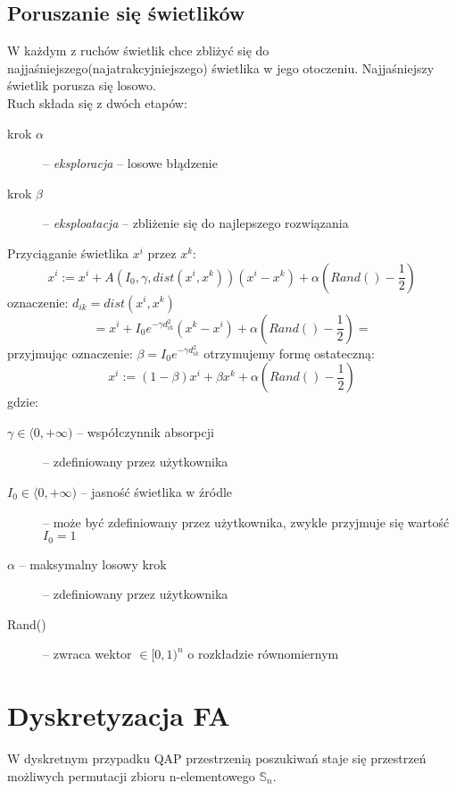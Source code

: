 \documentclass[12pt]{article}
\begin{document}
 \subsection{Poruszanie się świetlików}
 W każdym z ruchów świetlik chce zbliżyć się do najjaśniejszego(najatrakcyjniejszego) świetlika w jego otoczeniu. Najjaśniejszy świetlik porusza się losowo. \\
 Ruch składa się z dwóch etapów:
 \begin{description}
  \item[krok $\alpha$] -- \emph{eksploracja} -- losowe błądzenie
  \item[krok $\beta$] -- \emph{eksploatacja} -- zbliżenie się do najlepszego rozwiązania
 \end{description}
 Przyciąganie świetlika $x^i$ przez $x^k$:
\begin{equation}
 x^i := x^i + A\left(I_0, \gamma, dist\left(x^i, x^k\right)\right)\left(x^i - x^k \right) + \alpha \left(Rand() - \frac{1}{2}\right) 
\end{equation}
oznaczenie: $d_{ik} = dist(x^i, x^k)$
\begin{equation}
 = x^i + I_0 e^{- \gamma d_{ik}^2 } \left(x^k - x^i\right) + \alpha \left( Rand() - \frac{1}{2}\right) = 
\end{equation}
przyjmując oznaczenie: $\beta = I_0 e^{- \gamma d_{ik}^2 }$ otrzymujemy formę ostateczną:
\begin{equation} \label{eq:wzor_odl}
 x^i := (1 - \beta)x^i + \beta x^k + \alpha \left( Rand() - \frac{1}{2} \right)
\end{equation}
gdzie:
\begin{description}
 \item[$\gamma \in \langle 0, +\infty) $ -- współczynnik absorpcji] -- zdefiniowany przez użytkownika
 \item[$I_0 \in \langle 0, +\infty)$ -- jasność świetlika w źródle] -- może być zdefiniowany przez użytkownika, zwykle przyjmuje się wartość $I_0 = 1$
 \item[$\alpha$ -- maksymalny losowy krok] -- zdefiniowany przez użytkownika
 \item[Rand()] -- zwraca wektor $\in [0,1)^n$ o rozkładzie równomiernym
\end{description}

 \section{Dyskretyzacja FA}
  W dyskretnym przypadku QAP przestrzenią poszukiwań staje się przestrzeń możliwych permutacji zbioru n-elementowego $\mathbb{S}_n$.
  
\end{document}
